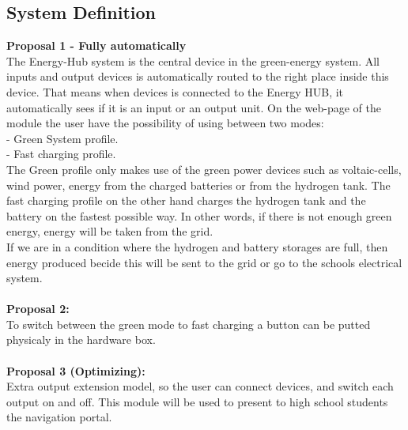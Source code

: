 \subsection{System Definition}
\textbf{Proposal 1 - Fully automatically}\\
The Energy-Hub system is the central device in the green-energy system. All
inputs and output devices is automatically routed to the right place inside this
device. That means when devices is connected to the Energy HUB, it automatically
sees if it is an input or an output unit. On the web-page of the module the user
have the possibility of using between two modes:
\\ - Green System profile.
\\ - Fast charging profile.
\\The Green profile only makes use of the green power devices such as
voltaic-cells, wind power, energy from the charged batteries or from the
hydrogen tank. 
The fast charging profile on the other hand charges the hydrogen tank and the
battery on the fastest possible way. In other words, if there is not enough
green energy, energy will be taken from the grid.
\\If we are in a condition where the hydrogen and battery storages are full,
then energy produced becide this will be sent to the grid or go to the schools
electrical system.\\\\
\textbf{Proposal 2:}\\
To switch between the green mode to fast charging a button can be putted
physicaly in the hardware box.\\\\
\textbf{Proposal 3 (Optimizing):}\\
Extra output extension model, so the user can connect devices, and switch
each output on and off. This module will be used to present to high school
students the navigation portal.